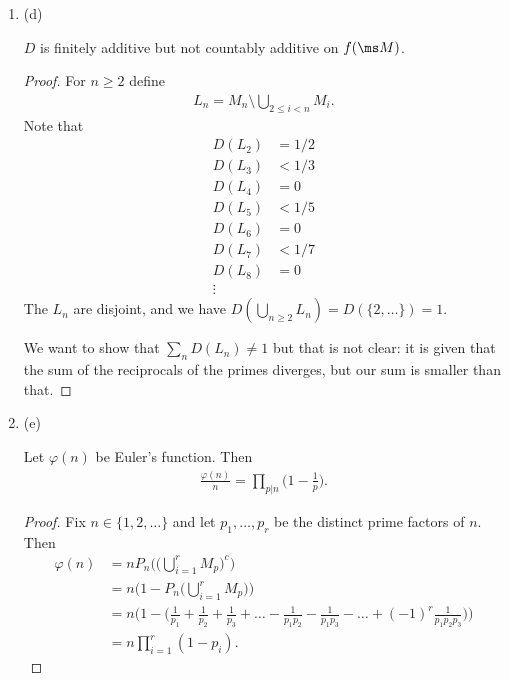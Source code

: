 \begin{enumerate}
\begin{enumerate}[label=(\alph*)]
  \item (d)
    \begin{claim*}
      $D$ is finitely additive but not countably additive on $f(\ms M)$.
    \end{claim*}
    \begin{proof}
      For $n \geq 2$ define
      \begin{align*}
        L_n = M_n \setminus \bigcup_{2 \leq i < n} M_i.
      \end{align*}
      Note that
      \begin{align*}
        D(L_2) &= 1/2 \\
        D(L_3) &< 1/3 \\
        D(L_4) &= 0 \\
        D(L_5) &< 1/5 \\
        D(L_6) &= 0 \\
        D(L_7) &< 1/7 \\
        D(L_8) &= 0 \\
        \vdots
      \end{align*}
      The $L_n$ are disjoint, and we have $D(\bigcup_{n \geq 2} L_n) = D(\{2, \ldots\}) = 1$.

      We want to show that $\sum_n D(L_n) \neq 1$ but that is not clear: it is given that the sum of the
      reciprocals of the primes diverges, but our sum is smaller than that.

    \end{proof}

  \item (e)
    \begin{claim*}
      Let $\varphi(n)$ be Euler's function. Then
      \begin{align*}
        \frac{\varphi(n)}{n} = \prod_{p|n}\big(1 - \frac{1}{p}\big).
      \end{align*}
    \end{claim*}
    \begin{proof}
      Fix $n \in \{1, 2, \ldots\}$ and let $p_1, \ldots, p_r$ be the distinct prime factors of $n$.
      Then
      \begin{align*}
        \varphi(n)
        &= n P_n\Big(\big(\bigcup_{i=1}^r M_p\big)^c\Big) \\
        &= n \Big(1 - P_n\big(\bigcup_{i=1}^r M_p\big)\Big) \\
        &= n \Big(1 - \Big(\frac{1}{p_1} + \frac{1}{p_2} + \frac{1}{p_3} + \ldots - \frac{1}{p_1p_2} - \frac{1}{p_1p_3} - \ldots + (-1)^r\frac{1}{p_1p_2p_3}\Big)\Big) \\
        &= n \prod_{i=1}^r(1 - p_i).
      \end{align*}
    \end{proof}


\end{enumerate}
\end{enumerate}

